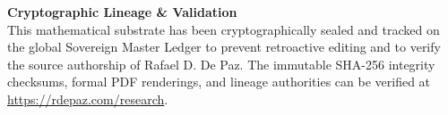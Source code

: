 \documentclass[12pt, a4paper]{article}
\theoremstyle{plain}
\theoremstyle{definition}
\theoremstyle{remark}
\begin{document}

\vspace{2em}
\noindent\hrulefill
\vspace{1em}

\noindent\textbf{Cryptographic Lineage \& Validation}\\
This mathematical substrate has been cryptographically sealed and tracked on the global Sovereign Master Ledger to prevent retroactive editing and to verify the source authorship of Rafael D. De Paz. The immutable SHA-256 integrity checksums, formal PDF renderings, and lineage authorities can be verified at \url{https://rdepaz.com/research}.



\end{document}
